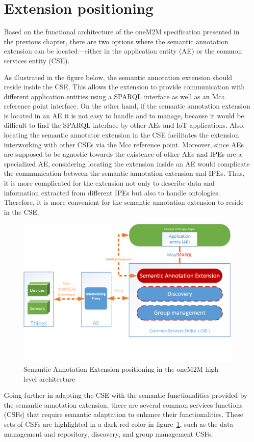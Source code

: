 \section{Extension positioning}
Based on the functional architecture of the oneM2M specification presented in the previous chapter, there are two options where the semantic annotation extension can be located—either in the application entity (AE) or the common services entity (CSE). \par \par
As illustrated in the figure below, the semantic annotation extension should reside inside the CSE. This allows the extension to provide communication with different application entities using a SPARQL interface as well as an Mca reference point interface. On the other hand, if the semantic annotation extension is located in an AE it is not easy to handle and to manage, because it would be difficult to find the SPARQL interface by other AEs and IoT applications. Also, locating the semantic annotator extension in the CSE facilitates the extension interworking with other CSEs via the Mcc reference point. Moreover, since AEs are supposed to be agnostic towards the existence of other AEs and IPEs are a specialized AE, considering locating the extension inside an AE would complicate the communication between the semantic annotation extension and IPEs. Thus, it is more complicated for the extension not only to describe data and information extracted from different IPEs but also to handle ontologies. Therefore, it is more convenient for the semantic annotation extension to reside in the CSE.


\begin{figure}[htbp]
    \centering
    \includegraphics[width=1.\textwidth]{resources/images/positioning}
    \caption{Semantic Annotation Extension positioning in the oneM2M high-level architecture }\label{fig:contrib2:high}
\end{figure}
Going further in adapting the CSE with the semantic functionalities provided by the semantic annotation extension, there are several common services functions (CSFs) that require semantic adaptation to enhance their functionalities. These sets of CSFs are highlighted in a dark red color in figure~\ref{fig:contrib2:high}, such as the data management and repository, discovery, and group management CSFs.

